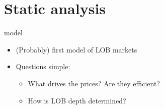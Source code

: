 \documentclass[english,10pt]{beamer}
\begin{document}



\section{Static analysis}

\begin{frame}{\cite{glosten_is_1994} model}
	\begin{itemize}
		\item (Probably) first model of LOB markets
		\item Questions simple:
		\begin{itemize}
			\item What drives the prices? Are they efficient?
			\item How is LOB depth determined?
		\end{itemize}
	\end{itemize}
\end{frame}
\end{document}
